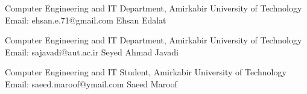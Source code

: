 

\begin{cventries}

  \cventry    
    {Computer Engineering and IT Department, Amirkabir University of Technology \newline Email: ehsan.e.71@gmail.com} %
    {Ehsan Edalat} %
    {} %
    {} %
    {
      \begin{cvitems} %
      \end{cvitems}
    }
  \cventry
    {Computer Engineering and IT Department, Amirkabir University of Technology \newline Email: sajavadi@aut.ac.ir} %
    {Seyed Ahmad Javadi} %
    {} %
    {} %
    {
      \begin{cvitems} %
      \end{cvitems}
    }
  \cventry
    {Computer Engineering and IT Student, Amirkabir University of Technology \newline Email: saeed.maroof@ymail.com} %
    {Saeed Maroof} %
    {} %
    {} %
    {
      \begin{cvitems} %
      \end{cvitems}
    }
\end{cventries}

